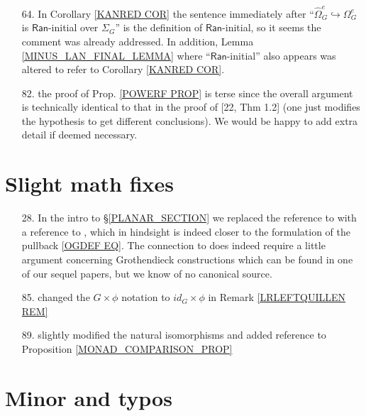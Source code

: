 \documentclass{article}
\begin{document}
\begin{itemize}
	\item[64.]
	In Corollary \ref{KANRED COR} the sentence immediately after ``$\widehat{\Omega}^e_G \hookrightarrow \Omega^e_G$ is
	$\mathsf{Ran}$-initial over $\Sigma_G$''
	is the definition of $\mathsf{Ran}$-initial,
	so it seems the comment was already addressed.
	In addition, Lemma \ref{MINUS_LAN_FINAL_LEMMA} where ``$\mathsf{Ran}$-initial'' also appears was altered to refer to Corollary \ref{KANRED COR}.
	\item[82.] the proof of Prop. \ref{POWERF PROP} is terse since the overall argument is technically identical to that in the proof of [22, Thm 1.2] (one just modifies the hypothesis to get different conclusions).
	We would be happy to add extra detail if deemed necessary. 
\end{itemize} 

\section{Slight math fixes}

\begin{itemize}
	\item[28.] In the intro to \S \ref{PLANAR_SECTION}
	we replaced the reference to 
	\cite[Prop. 5.47]{Pe17}
	with a reference to 
	\cite[Def. 5.44]{Pe17},
	which in hindsight is indeed closer 
	to the formulation of the pullback \eqref{OGDEF EQ}.
	The connection to \cite[Prop. 5.47]{Pe17}
	does indeed require a little argument concerning Grothendieck constructions {\color{red} which can be found in one of our sequel papers}, 
	but we know of no canonical source.
	
	\item[85.] changed the $G \times \phi$ notation 
	to $id_G \times \phi$ in Remark \ref{LRLEFTQUILLEN REM}
	
	\item[89.] slightly modified the natural isomorphisms and added reference to Proposition \ref{MONAD_COMPARISON_PROP} 
\end{itemize}


\section{Minor and typos} 
\end{document}
